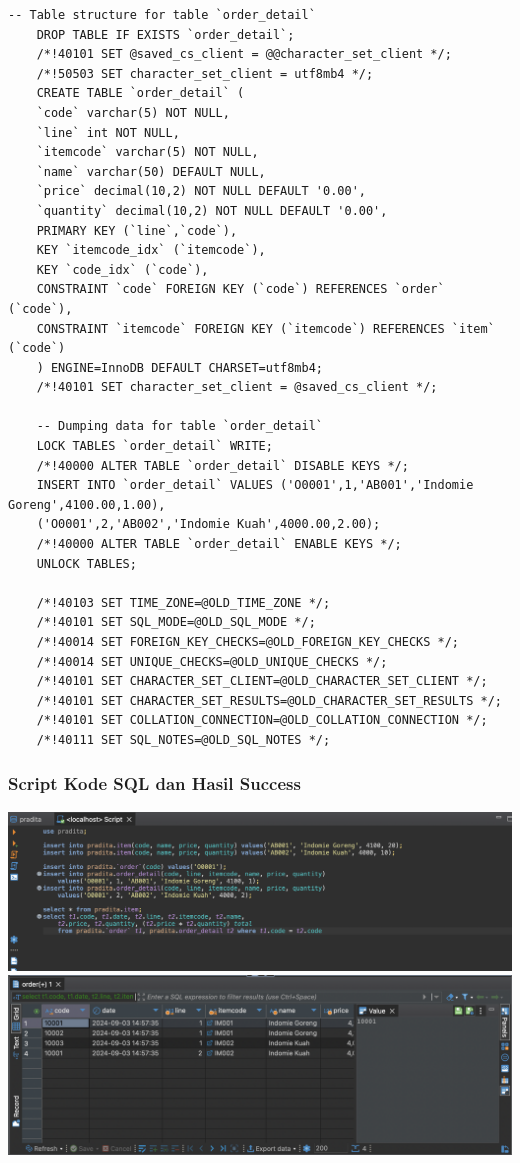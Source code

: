 \begin{lstlisting}[style=JavaStyle]
	-- Table structure for table `order_detail`
	DROP TABLE IF EXISTS `order_detail`;
	/*!40101 SET @saved_cs_client = @@character_set_client */;
	/*!50503 SET character_set_client = utf8mb4 */;
	CREATE TABLE `order_detail` (
	`code` varchar(5) NOT NULL,
	`line` int NOT NULL,
	`itemcode` varchar(5) NOT NULL,
	`name` varchar(50) DEFAULT NULL,
	`price` decimal(10,2) NOT NULL DEFAULT '0.00',
	`quantity` decimal(10,2) NOT NULL DEFAULT '0.00',
	PRIMARY KEY (`line`,`code`),
	KEY `itemcode_idx` (`itemcode`),
	KEY `code_idx` (`code`),
	CONSTRAINT `code` FOREIGN KEY (`code`) REFERENCES `order` (`code`),
	CONSTRAINT `itemcode` FOREIGN KEY (`itemcode`) REFERENCES `item` (`code`)
	) ENGINE=InnoDB DEFAULT CHARSET=utf8mb4;
	/*!40101 SET character_set_client = @saved_cs_client */;
	
	-- Dumping data for table `order_detail`
	LOCK TABLES `order_detail` WRITE;
	/*!40000 ALTER TABLE `order_detail` DISABLE KEYS */;
	INSERT INTO `order_detail` VALUES ('O0001',1,'AB001','Indomie Goreng',4100.00,1.00),
	('O0001',2,'AB002','Indomie Kuah',4000.00,2.00);
	/*!40000 ALTER TABLE `order_detail` ENABLE KEYS */;
	UNLOCK TABLES;
	
	/*!40103 SET TIME_ZONE=@OLD_TIME_ZONE */;
	/*!40101 SET SQL_MODE=@OLD_SQL_MODE */;
	/*!40014 SET FOREIGN_KEY_CHECKS=@OLD_FOREIGN_KEY_CHECKS */;
	/*!40014 SET UNIQUE_CHECKS=@OLD_UNIQUE_CHECKS */;
	/*!40101 SET CHARACTER_SET_CLIENT=@OLD_CHARACTER_SET_CLIENT */;
	/*!40101 SET CHARACTER_SET_RESULTS=@OLD_CHARACTER_SET_RESULTS */;
	/*!40101 SET COLLATION_CONNECTION=@OLD_COLLATION_CONNECTION */;
	/*!40111 SET SQL_NOTES=@OLD_SQL_NOTES */;
\end{lstlisting}

\subsubsection{Script Kode SQL dan Hasil Success}
\includegraphics[width=1\textwidth]{assets/pertemuan12/dbeaver-database.png} 
\includegraphics[width=1\textwidth]{assets/pertemuan12/dbeaver-success-script.png}


